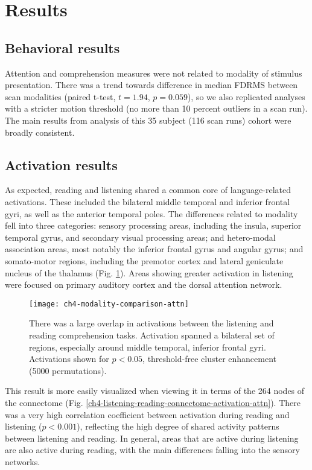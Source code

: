 \section{Results}

\subsection{Behavioral results}

Attention and comprehension measures were not related to modality of stimulus presentation. There was a trend towards difference in median FDRMS between scan modalities (paired t-test, $t = 1.94$, $p = 0.059$), so we also replicated analyses with a stricter motion threshold (no more than 10 percent outliers in a scan run). The main results from analysis of this 35 subject (116 scan runs) cohort were broadly consistent.

\subsection{Activation results}

As expected, reading and listening shared a common core of language-related activations. These included the bilateral middle temporal and inferior frontal gyri, as well as the  anterior temporal poles. The differences related to modality fell into three categories: sensory processing areas, including the insula, superior temporal gyrus, and secondary visual processing areas; and hetero-modal association areas, most notably the inferior frontal gyrus and angular gyrus; and somato-motor regions, including the premotor cortex and lateral geniculate nucleus of the thalamus (Fig. \ref{fig:ch4-modality-comparison-attn}). Areas showing greater activation in listening were focused on primary auditory cortex and the dorsal attention network.

\begin{figure}[t]
	\centering
	\texttt{[image: ch4-modality-comparison-attn]}
    \caption[Large overlap between listening and reading activation.]{There was a large overlap in activations between the listening and reading comprehension tasks. Activation spanned a bilateral set of regions, especially around middle temporal, inferior frontal gyri. Activations shown for $p < 0.05$, threshold-free cluster enhancement (5000 permutations).}
	\label{fig:ch4-modality-comparison-attn}
\end{figure}

This result is more easily visualized when viewing it in terms of the 264 nodes of the connectome (Fig. \ref{ch4-listening-reading-connectome-activation-attn}). There was a very high correlation coefficient between activation during reading and listening ($p < 0.001$), reflecting the high degree of shared activity patterns between listening and reading. In general, areas that are active during listening are also active during reading, with the main differences falling into the sensory networks. 

